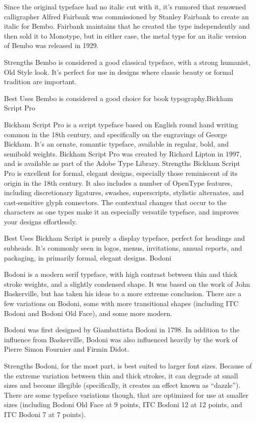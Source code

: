 \documentclass[12pt,a4paper,twocolumn]{book} %
\begin{document}
Since the original typeface had no italic cut with it, it’s rumored that renowned calligrapher Alfred Fairbank was commissioned by Stanley Fairbank to create an italic for Bembo. Fairbank maintains that he created the type independently and then sold it to Monotype, but in either case, the metal type for an italic version of Bembo was released in 1929.

Strengths
Bembo is considered a good classical typeface, with a strong humanist, Old Style look. It’s perfect for use in designs where classic beauty or formal tradition are important.

Best Uses
Bembo is considered a good choice for book typography.Bickham Script Pro

Bickham Script Pro is a script typeface based on English round hand writing common in the 18th century, and specifically on the engravings of George Bickham. It’s an ornate, romantic typeface, available in regular, bold, and semibold weights. Bickham Script Pro was created by Richard Lipton in 1997, and is available as part of the Adobe Type Library.
Strengths
Bickham Script Pro is excellent for formal, elegant designs, especially those reminiscent of its origin in the 18th century. It also includes a number of OpenType features, including discretionary ligatures, swashes, superscripts, stylistic alternates, and cast-sensitive glyph connectors. The contextual changes that occur to the characters as one types make it an especially versatile typeface, and improves your designs effortlessly.

Best Uses
Bickham Script is purely a display typeface, perfect for headings and subheads. It’s commonly seen in logos, menus, invitations, annual reports, and packaging, in primarily formal, elegant designs.
Bodoni

Bodoni is a modern serif typeface, with high contrast between thin and thick stroke weights, and a slightly condensed shape. It was based on the work of John Baskerville, but has taken his ideas to a more extreme conclusion. There are a few variations on Bodoni, some with more transitional shapes (including ITC Bodoni and Bodoni Old Face), and some more modern.

Bodoni was first designed by Giambattista Bodoni in 1798. In addition to the influence from Baskerville, Bodoni was also influenced heavily by the work of Pierre Simon Fournier and Firmin Didot.

Strengths
Bodoni, for the most part, is best suited to larger font sizes. Because of the extreme variation between thin and thick strokes, it can degrade at small sizes and become illegible (specifically, it creates an effect known as “dazzle”). There are some typeface variations though, that are optimized for use at smaller sizes (including Bodoni Old Face at 9 points, ITC Bodoni 12 at 12 points, and ITC Bodoni 7 at 7 points).
\end{document}
